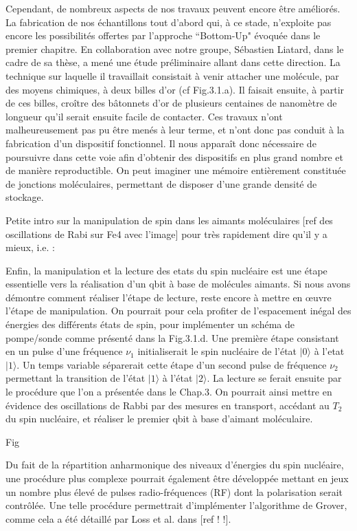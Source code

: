 Cependant, de nombreux aspects de nos travaux peuvent encore être améliorés. La fabrication de nos échantillons tout d'abord qui, à ce stade, n'exploite pas encore les possibilités offertes par l'approche ``Bottom-Up" évoquée dans le premier chapitre. En collaboration avec notre groupe, Sébastien Liatard, dans le cadre de sa thèse, a mené une étude préliminaire allant dans cette direction. La technique sur laquelle il travaillait consistait à venir attacher une molécule, par des moyens chimiques, à deux billes d'or (cf Fig.3.1.a). Il faisait ensuite, à partir de ces billes, croître des bâtonnets d'or de plusieurs centaines de nanomètre de longueur qu'il serait ensuite facile de contacter. Ces travaux n'ont malheureusement pas pu être menés à leur terme, et n'ont donc pas conduit à la fabrication d'un dispositif fonctionnel. Il nous apparaît donc nécessaire de poursuivre dans cette voie afin d'obtenir des dispositifs en plus grand nombre et de manière reproductible. On peut imaginer une mémoire entièrement constituée de jonctions moléculaires, permettant de disposer d'une grande densité de stockage.




Petite intro sur la manipulation de spin dans les aimants moléculaires [ref des oscillations de Rabi sur Fe4 avec l'image] pour très rapidement dire qu'il y a mieux, i.e. :



Enfin, la manipulation et la lecture des etats du spin nucléaire est une étape essentielle vers la réalisation d'un qbit à base de molécules aimants. Si nous avons démontre comment réaliser l’étape de lecture, reste encore à mettre en œuvre l’étape de manipulation. On pourrait pour cela profiter de l'espacement inégal des énergies des différents états de spin, pour implémenter un schéma de pompe/sonde comme présenté dans la Fig.3.1.d. Une première étape consistant en un pulse d'une fréquence $\nu_1$ initialiserait le spin nucléaire de l’état $|0\rangle$ à l'etat $|1\rangle$. Un temps variable séparerait cette étape d'un second pulse de fréquence $\nu_2$ permettant la transition de l’état $|1\rangle$ à l’état $|2\rangle$. La lecture se ferait ensuite par le procédure que l'on a présentée dans le Chap.3. On pourrait ainsi mettre en évidence des oscillations de Rabbi par des mesures en transport, accédant au $T_2$ du spin nucléaire, et réaliser le premier qbit à base d'aimant moléculaire.

Fig

Du fait de la répartition anharmonique des niveaux d’énergies du spin nucléaire, une procédure plus complexe pourrait également être développée mettant en jeux un nombre plus élevé de pulses radio-fréquences (RF) dont la polarisation serait contrôlée. Une telle procédure permettrait d’implémenter l'algorithme de Grover, comme cela a été détaillé par Loss et al. dans [ref ! !].

